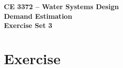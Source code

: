 \documentclass[12pt]{article}
\begin{document}
\begin{center}
{\textbf{{ CE 3372 -- Water Systems Design} \\ {Demand Estimation} \\ {Exercise Set 3}}}
\end{center}

\section*{\small{Exercise}} 
\begin{enumerate}





\end{enumerate}
\end{document}
